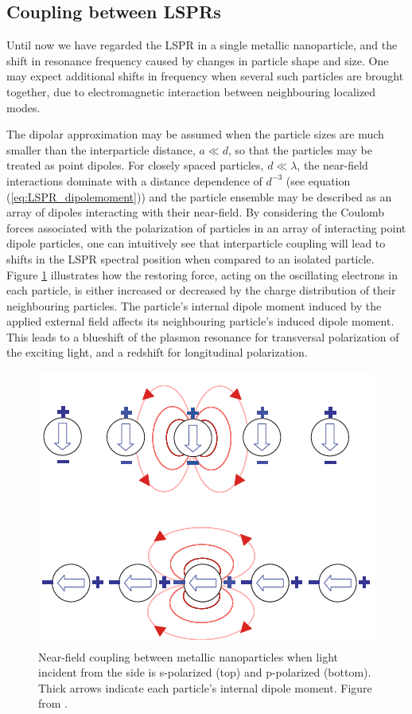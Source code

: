 \subsection{Coupling between LSPRs}
Until now we have regarded the LSPR in a single metallic nanoparticle, and the shift in resonance frequency caused by changes in particle shape and size. One may expect additional shifts in frequency when several such particles are brought together, due to electromagnetic interaction between neighbouring localized modes. 

The dipolar approximation may be assumed when the particle sizes are much smaller than the interparticle distance, $a\ll d$, so that the particles may be treated as point dipoles. For closely spaced particles, $d\ll \lambda$, the near-field interactions dominate with a distance dependence of $d^{-3}$ (see equation (\ref{eq:LSPR_dipolemoment})) and the particle ensemble may be described as an array of dipoles interacting with their near-field\cite{maier}. By considering the Coulomb forces associated with the polarization of particles in an array of interacting point dipole particles, one can intuitively see that interparticle coupling will lead to shifts in the LSPR spectral position when compared to an isolated particle. Figure \ref{fig:nearfield_coupling} illustrates how the restoring force, acting on the oscillating electrons in each particle, is either increased or decreased by the charge distribution of their neighbouring particles. The particle's internal dipole moment induced by the applied external field affects its neighbouring particle's induced dipole moment. This leads to a blueshift of the plasmon resonance for transversal polarization of the exciting light, and a redshift for longitudinal polarization.
\begin{figure}
    \centering
    \includegraphics[width=0.5\linewidth]{figures/Ch2/nearfieldcoupling.PNG}
    \caption{Near-field coupling between metallic nanoparticles when light incident from the side is s-polarized (top) and p-polarized (bottom). Thick arrows indicate each particle's internal dipole moment. Figure from \cite{maier}.}
    \label{fig:nearfield_coupling}
\end{figure}


